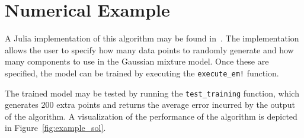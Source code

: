 \section{Numerical Example}
\label{sec:numerical}
%

A Julia implementation of this algorithm may be found
in~\cite{satici_implementation}. The implementation allows the user to specify
how many data points to randomly generate and how many components to use in the
Gaussian mixture model. Once these are specified, the model can be trained by 
executing the \texttt{execute\_em!} function. 

The trained model may be tested by running the \texttt{test\_training} function,
which generates $200$ extra points and returns the average error incurred by the
output of the algorithm. A visualization of the performance of the algorithm is
depicted in Figure~\ref{fig:example_sol}.

